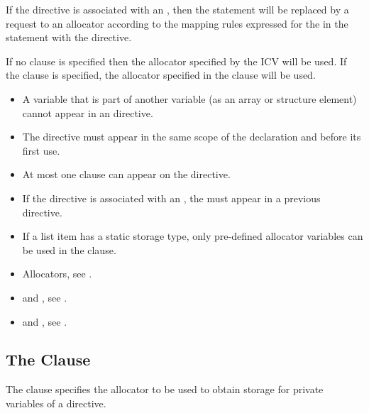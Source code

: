 \begin{ccppspecific}
If the directive is associated with an , then the
statement will be replaced by a request to an allocator according to the mapping
rules expressed for the  in the statement with the
 directive.

If no clause is specified then the allocator specified by the
 ICV will be used.
If the  clause is specified, the allocator specified in the
clause will be used.


\restrictions
\begin{itemize}
\item A variable that is part of another variable (as an array or structure
element) cannot appear in an  directive.
\item The directive must appear in the same scope of the 
declaration and before its first use.
\item At most one  clause can appear on the 
directive.
\item If the directive is associated with an , the
 must appear in a previous  directive.
\item If a list item has a static storage type, only pre-defined allocator
variables can be used in the  clause.
\end{itemize}


\crossreferences
\begin{itemize}
\item Allocators, see .
\item {} and , see .
\item {} and , see .
\end{itemize}


\end{ccppspecific}



\subsection{The  Clause}
\label{subsec:allocate Clause}
\summary
The  clause specifies the allocator to be used to obtain storage for private variables of a directive.

